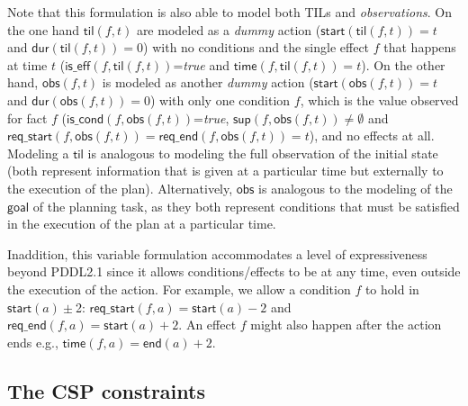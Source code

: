 \documentclass{ecai}
\newcommand{\dur}{\mathsf{dur}}    %
\newcommand{\iscond}{\mathsf{is\_cond}}    %
\newcommand{\iseff}{\mathsf{is\_eff}}    %
\newcommand{\obs}{\mathsf{obs}}    %
\newcommand{\start}{\mathsf{start}}%
\newcommand{\en}{\mathsf{end}}     %
\newcommand{\til}{\mathsf{til}}    %
\newcommand{\supp}{\mathsf{sup}}   %
\newcommand{\tim}{\mathsf{time}}   %
\newcommand{\reqs}{\mathsf{req\_{start}}} %
\newcommand{\reqe}{\mathsf{req\_{end}}}   %
\newcommand{\goal}{\mathsf{goal}}  %
\begin{document}
Note that this formulation is also able to model both TILs and {\em observations}. On the one hand $\til(f,t)$ are modeled as a {\em dummy} action ($\start(\til(f,t))=t$ and $\dur(\til(f,t))=0$) with no conditions and the single effect $f$ that happens at time $t$ ($\iseff(f,\til(f,t))$=\textit{true} and $\tim(f,\til(f,t))=t$). On the other hand, $\obs(f,t)$ is modeled as another {\em dummy} action ($\start(\obs(f,t))=t$ and $\dur(\obs(f,t))=0$) with only one condition $f$, which is the value observed for fact $f$ ($\iscond(f,\obs(f,t))$=\textit{true}, $\supp(f,\obs(f,t))\neq \emptyset$ and $\reqs(f,\obs(f,t))=\reqe(f,\obs(f,t))=t$), and no effects at all. Modeling a $\til$ is analogous to modeling the full observation of the initial state (both represent information that is given at a particular time but externally to the execution of the plan). Alternatively, $\obs$ is analogous to the modeling of the $\goal$ of the planning task, as they both represent conditions that must be satisfied in the execution of the plan at a particular time.

Inaddition, this variable formulation accommodates a level of expressiveness beyond PDDL2.1 since it allows conditions/effects to be at any time, even outside the execution of the action. For example, we allow a condition $f$ to hold in $\start(a)\pm$2: $\reqs(f,a)=\start(a)-2$ and $\reqe(f,a)=\start(a)+2$. An effect $f$ might also happen after the action ends e.g., $\tim(f,a)=\en(a)+2$.





\subsection{The CSP constraints}
\label{section:CSPconstraints}
\end{document}
